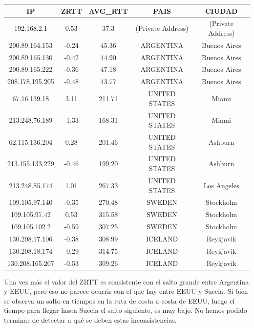 \begin{tabular}{|c@{\hspace{5ex}}c@{\hspace{5ex}}c@{\hspace{5ex}}c@{\hspace{5ex}}c|}
 \hline
 \rule{0pt}{1.2em}IP & ZRTT & AVG\_RTT & PAIS & CIUDAD\\[0.2em]
 \hline

\rule{0pt}{1.2em} 192.168.2.1  &  0.53 & 37.3 & (Private Address) & (Private Address) \\[0.2em]
\rule{0pt}{1.2em} 200.89.164.153  &  -0.24 & 45.36 & ARGENTINA & Buenos Aires \\[0.2em]
\rule{0pt}{1.2em} 200.89.165.130  &  -0.42 & 44.90 & ARGENTINA & Buenos Aires \\[0.2em]
\rule{0pt}{1.2em} 200.89.165.222  &  -0.36 & 47.18 & ARGENTINA & Buenos Aires \\[0.2em]
\rule{0pt}{1.2em} 208.178.195.205  &  -0.48 & 43.77 & ARGENTINA & Buenos Aires \\[0.2em]
\rule{0pt}{1.2em} 67.16.139.18  &  3.11 & 211.71 & UNITED STATES & Miami \\[0.2em]
\rule{0pt}{1.2em} 213.248.76.189  &  -1.33 & 168.31 & UNITED STATES & Miami \\[0.2em]
\rule{0pt}{1.2em} 62.115.136.204  &  0.28 & 201.46 & UNITED STATES & Ashburn \\[0.2em]
\rule{0pt}{1.2em} 213.155.133.229  &  -0.46 & 199.20 & UNITED STATES & Ashburn \\[0.2em]
\rule{0pt}{1.2em} 213.248.85.174  &  1.01 & 267.33 & UNITED STATES & Los Angeles \\[0.2em]
\rule{0pt}{1.2em} 109.105.97.140  &  -0.35 & 270.48 & SWEDEN & Stockholm \\[0.2em]
\rule{0pt}{1.2em} 109.105.97.42  &  0.53 & 315.58 & SWEDEN & Stockholm \\[0.2em]
\rule{0pt}{1.2em} 109.105.102.2  &  -0.59 & 307.25 & SWEDEN & Stockholm \\[0.2em]
\rule{0pt}{1.2em} 130.208.17.106  &  -0.38 & 308.99 & ICELAND & Reykjavik \\[0.2em]
\rule{0pt}{1.2em} 130.208.18.174  &  -0.29 & 314.75 & ICELAND & Reykjavik \\[0.2em]
\rule{0pt}{1.2em} 130.208.165.207  &  -0.53 & 309.26 & ICELAND & Reykjavik \\[0.2em]
\hline
 \end{tabular}

 Una vez más el valor del ZRTT es consistente con el salto grande entre Argentina y EEUU, pero eso no parece ocurrir con el que hay entre EEUU y Suecia.
 Si bien se observa un salto en tiempos en la ruta de costa a costa de EEUU, luego el tiempo para llegar hasta Suecia el salto siguiente, es muy bajo.
 No hemos podido terminar de detectar a qué se deben estas inconsistencias.


